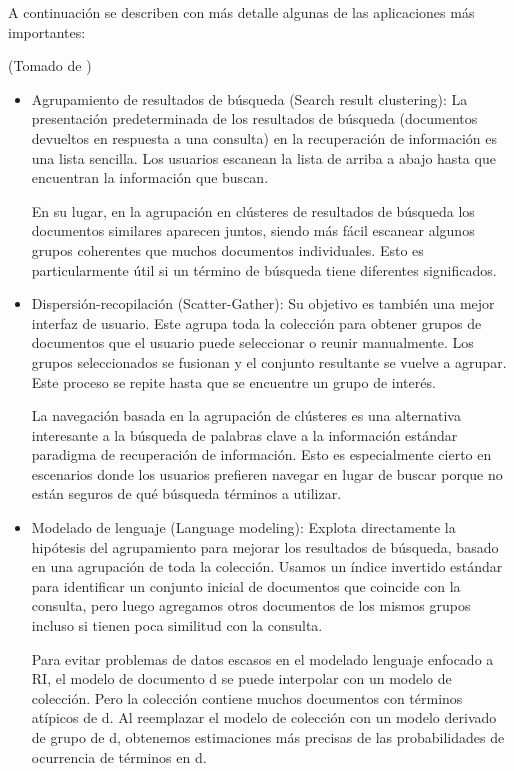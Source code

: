 \documentclass{llncs}
\begin{document}
A continuaci\'on se describen con m\'as detalle algunas de las aplicaciones m\'as importantes:
\begin{flushright}
	\scriptsize*(Tomado de \cite{B1})
	\normalsize
\end{flushright} 
\begin{itemize}
	\item Agrupamiento de resultados de búsqueda (Search result clustering): La presentación predeterminada de los resultados de búsqueda (documentos devueltos en respuesta a una consulta) en la recuperación de información es una lista sencilla. Los usuarios escanean la lista de arriba a abajo hasta que encuentran la información que buscan. 
	
	En su lugar, en la agrupación en clústeres de resultados de búsqueda los documentos similares aparecen juntos, siendo más fácil escanear algunos grupos coherentes que muchos documentos individuales. Esto es particularmente útil si un término de búsqueda tiene diferentes significados.
	
	\item Dispersión-recopilación (Scatter-Gather): Su objetivo es tambi\'en una mejor interfaz de usuario. Este agrupa toda la colección para obtener grupos de documentos que el usuario puede seleccionar o reunir manualmente. Los grupos seleccionados se fusionan y el conjunto resultante se vuelve a agrupar. Este proceso se repite hasta que se encuentre un grupo de interés.
	
	La navegación basada en la agrupaci\'on de clústeres es una alternativa interesante a la búsqueda de palabras clave a la información estándar paradigma de recuperación de información. Esto es especialmente cierto en escenarios donde los usuarios prefieren navegar en lugar de buscar porque no están seguros de qué búsqueda términos a utilizar.
	
	\item Modelado de lenguaje (Language modeling): Explota directamente la hipótesis del agrupamiento para mejorar los resultados de búsqueda, basado en una agrupación de toda la colección. Usamos un índice invertido estándar para identificar un conjunto inicial de documentos que coincide con la consulta, pero luego agregamos otros documentos de los mismos grupos incluso si tienen poca similitud con la consulta. 
	
 	Para evitar problemas de datos escasos en el modelado lenguaje enfocado a RI, el modelo de documento d se puede interpolar con un modelo de colección. Pero la colección contiene muchos documentos con términos atípicos de d. Al reemplazar el modelo de colección con un modelo derivado de grupo de d, obtenemos estimaciones más precisas de las probabilidades de ocurrencia de términos en d.
	

\end{itemize}
\end{document}
